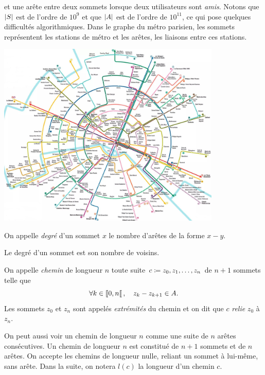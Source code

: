 \documentclass{magnolia}
\begin{document}
\begin{exemples}
  et une arête entre deux sommets lorsque deux utilisateurs sont \emph{amis}. Notons que
  $\left|S\right|$ est de l'ordre de $10^9$ et que $\left|A\right|$ est de l'ordre
  de $10^{11}$, ce qui pose quelques difficultés algorithmiques.
\exemple Dans le graphe du métro parisien, les sommets représentent les stations de
  métro et les arêtes, les liaisons entre ces stations.
\begin{center}
  \includegraphics[width=0.8\textwidth]{../../Commun/Images/python-cours-metro-paris}
\end{center}
\end{exemples}


\begin{definition}
On appelle \emph{degré} d'un sommet $x$ le nombre d'arêtes de la forme $x-y$.
\end{definition}

\begin{remarqueUnique}
\remarque Le degré d'un sommet est son nombre de voisins.
\end{remarqueUnique}

\begin{definition}
On appelle \emph{chemin} de longueur $n$ toute suite $c\coloneqq z_0,z_1,\ldots,z_{n}$ de $n+1$ sommets telle que
\[\forall k\in\left\llbracket 0,n\right\llbracket,\quad z_k-z_{k+1}\in A.\]
Les sommets $z_0$ et $z_n$ sont appelés \emph{extrémités} du chemin et on dit que $c$
\emph{relie} $z_0$ à $z_n$. 
\end{definition}

\begin{remarques}
\remarque On peut aussi voir un chemin de longueur $n$ comme une suite de $n$ arêtes consécutives. Un chemin de longueur $n$ est constitué de $n+1$ sommets et de $n$ arêtes.
\remarque On accepte les chemins de longueur nulle, reliant un sommet à lui-même, sans arête.
\remarque Dans la suite, on notera $l(c)$ la longueur d'un chemin $c$.
\end{remarques}
\end{document}
